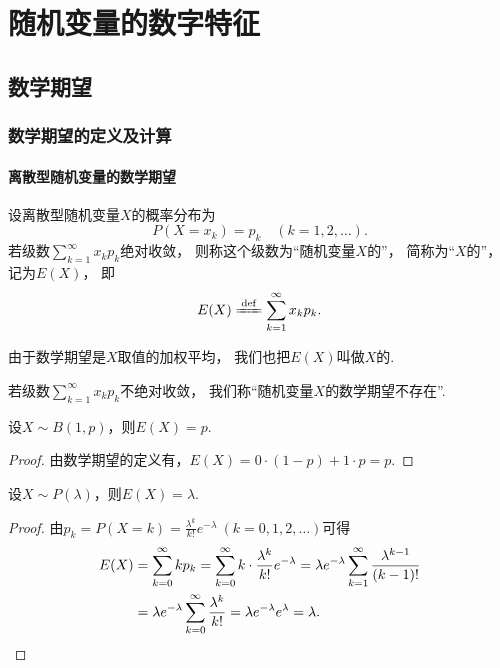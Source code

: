 \chapter{随机变量的数字特征}
\section{数学期望}
\subsection{数学期望的定义及计算}
\subsubsection{离散型随机变量的数学期望}
\begin{definition}
设离散型随机变量\(X\)的概率分布为\[
	P(X=x_k) = p_k
	\quad(k=1,2,\dotsc).
\]
若级数\(\sum_{k=1}^\infty x_k p_k\)绝对收敛，
则称这个级数为“随机变量\(X\)的”，
简称为“\(X\)的”，
记为\(E(X)\)，
即\begin{equation}\label{equation:随机变量的数字特征.数学期望的定义式}
	E(X) \defeq \sum_{k=1}^\infty x_k p_k.
\end{equation}

由于数学期望是\(X\)取值的加权平均，
我们也把\(E(X)\)叫做\(X\)的.

若级数\(\sum_{k=1}^\infty x_k p_k\)不绝对收敛，
我们称“随机变量\(X\)的数学期望不存在”.
\end{definition}

\begin{theorem}\label{theorem:随机变量的数字特征.0-1分布的数学期望}
设\(X \sim B(1,p)\)，则\(E(X) = p\).
\begin{proof}
由数学期望的定义有，\(E(X) = 0 \cdot (1-p) + 1 \cdot p = p\).
\end{proof}
\end{theorem}

\begin{theorem}\label{theorem:随机变量的数字特征.泊松分布的数学期望}
设\(X \sim P(\lambda)\)，则\(E(X) = \lambda\).
\begin{proof}
由\(p_k = P(X=k) = \frac{\lambda^k}{k!} e^{-\lambda}\ (k=0,1,2,\dotsc)\)可得
\begin{align*}
	E(X) &= \sum_{k=0}^\infty k p_k
	= \sum_{k=0}^\infty k \cdot \frac{\lambda^k}{k!} e^{-\lambda}
	= \lambda e^{-\lambda} \sum_{k=1}^\infty \frac{\lambda^{k-1}}{(k-1)!} \\
	&= \lambda e^{-\lambda} \sum_{k=0}^\infty \frac{\lambda^k}{k!}
	= \lambda e^{-\lambda} e^\lambda
	= \lambda.
	\qedhere
\end{align*}
\end{proof}
\end{theorem}

